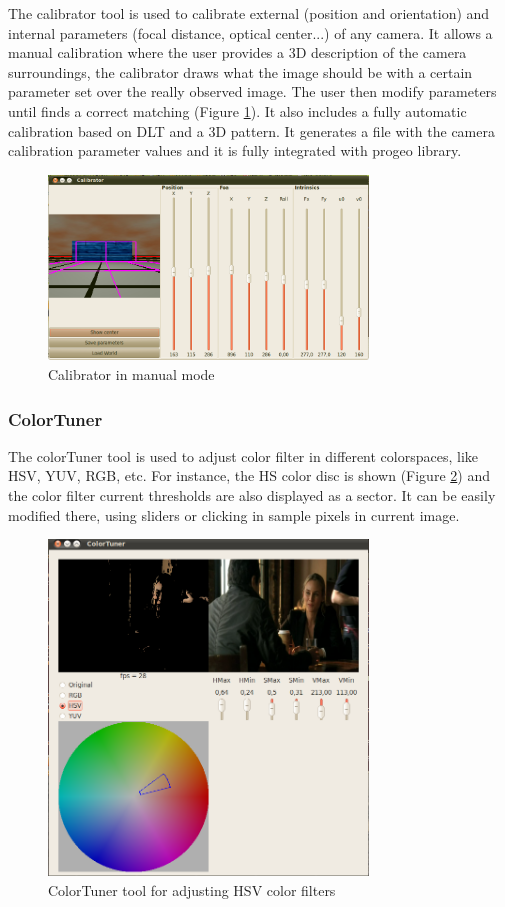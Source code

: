 \documentclass[twocolumn]{svjour3}          %
\begin{document}
The calibrator tool is used to calibrate external (position and orientation) and internal parameters (focal distance, optical center...) of any camera. It allows a manual calibration where the user provides a 3D description of the camera surroundings, the calibrator draws what the image should be with a certain parameter set over the really observed image. The user then modify parameters until finds a correct matching (Figure \ref{fig:calibrator}). It also includes a fully automatic calibration based on DLT and a 3D pattern. It generates a file with the camera calibration parameter values and it is fully integrated with progeo library.

\begin{figure}[h!]
  \includegraphics[width=8.5cm]{figs/calibratorGUI.png}
\caption{Calibrator in manual mode}
\label{fig:calibrator}
\end{figure}

\subsubsection{ColorTuner}

The colorTuner tool is used to adjust color filter in different colorspaces, like HSV, YUV, RGB, etc. For instance, the HS color disc is shown (Figure \ref{fig:colortuner}) and the color filter current thresholds are also displayed as a sector. It can be easily modified there, using sliders or clicking in sample pixels in current image.

\begin{figure}[h!]
  \includegraphics[width=8.5cm]{figs/colorTunerHSV.png}
\caption{ColorTuner tool for adjusting HSV color filters}
\label{fig:colortuner}
\end{figure}
\end{document}
